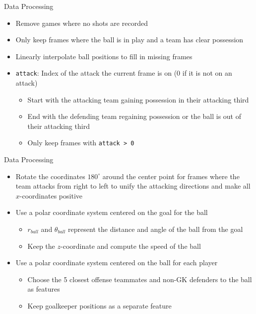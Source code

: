 \documentclass[
  11pt,
  ignorenonframetext,
]{beamer}
\providecommand{\tightlist}{%
  \setlength{\itemsep}{0pt}\setlength{\parskip}{0pt}}
\begin{document}
\begin{frame}[fragile]{Data Processing}
\protect{}\label{data-processing}
\begin{itemize}
\tightlist
\item
  Remove games where no shots are recorded
\item
  Only keep frames where the ball is in play and a team has clear
  possession
\item
  Linearly interpolate ball positions to fill in missing frames
\item
  \texttt{attack}: Index of the attack the current frame is on (0 if it
  is not on an attack)

  \begin{itemize}
  \tightlist
  \item
    Start with the attacking team gaining possession in their attacking
    third
  \item
    End with the defending team regaining possession or the ball is out
    of their attacking third
  \item
    Only keep frames with \texttt{attack\ \textgreater{}\ 0}
  \end{itemize}
\end{itemize}
\end{frame}

\begin{frame}{Data Processing}
\protect{}\label{data-processing-1}
\begin{itemize}
\tightlist
\item
  Rotate the coordinates \(180^{\circ}\) around the center point for
  frames where the team attacks from right to left to unify the
  attacking directions and make all \(x\)-coordinates positive
\item
  Use a polar coordinate system centered on the goal for the ball

  \begin{itemize}
  \tightlist
  \item
    \(r_{ball}\) and \(\theta_{ball}\) represent the distance and angle
    of the ball from the goal
  \item
    Keep the \(z\)-coordinate and compute the speed of the ball
  \end{itemize}
\item
  Use a polar coordinate system centered on the ball for each player

  \begin{itemize}
  \tightlist
  \item
    Choose the 5 closest offense teammates and non-GK defenders to the
    ball as features
  \item
    Keep goalkeeper positions as a separate feature
  \end{itemize}
\end{itemize}
\end{frame}
\end{document}

